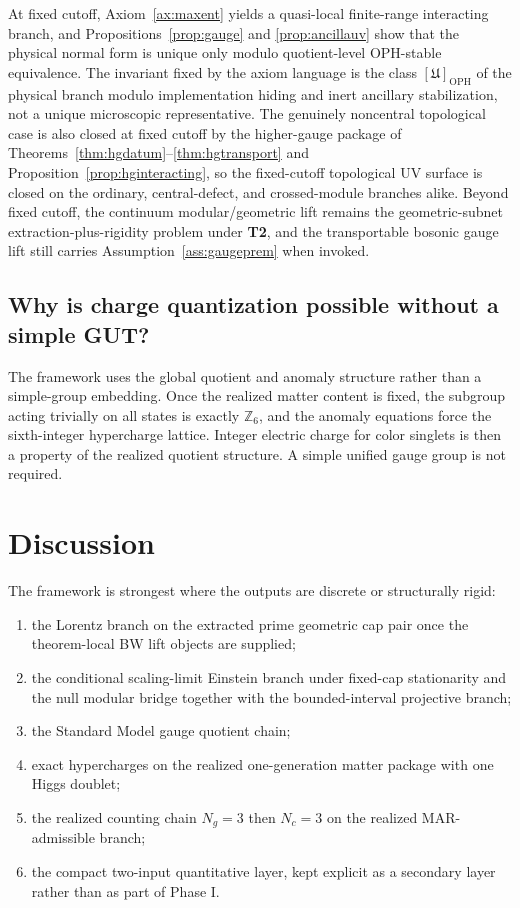 \documentclass[11pt]{article}
\begin{document}
At fixed cutoff, Axiom~\ref{ax:maxent} yields a quasi-local finite-range interacting branch, and Propositions~\ref{prop:gauge} and \ref{prop:ancillauv} show that the physical normal form is unique only modulo quotient-level OPH-stable equivalence. The invariant fixed by the axiom language is the class \([\mathfrak U]_{\mathrm{OPH}}\) of the physical branch modulo implementation hiding and inert ancillary stabilization, not a unique microscopic representative. The genuinely noncentral topological case is also closed at fixed cutoff by the higher-gauge package of Theorems~\ref{thm:hgdatum}--\ref{thm:hgtransport} and Proposition~\ref{prop:hginteracting}, so the fixed-cutoff topological UV surface is closed on the ordinary, central-defect, and crossed-module branches alike. Beyond fixed cutoff, the continuum modular/geometric lift remains the geometric-subnet extraction-plus-rigidity problem under \textbf{T2}, and the transportable bosonic gauge lift still carries Assumption~\ref{ass:gaugeprem} when invoked.

\subsection{Why is charge quantization possible without a simple GUT?}

The framework uses the global quotient and anomaly structure rather than a simple-group embedding. Once the realized matter content is fixed, the subgroup acting trivially on all states is exactly $\mathbb Z_6$, and the anomaly equations force the sixth-integer hypercharge lattice. Integer electric charge for color singlets is then a property of the realized quotient structure. A simple unified gauge group is not required.

\section{Discussion}

The framework is strongest where the outputs are discrete or structurally rigid:
\begin{enumerate}[leftmargin=2em]
\item the Lorentz branch on the extracted prime geometric cap pair once the theorem-local BW lift objects are supplied;
\item the conditional scaling-limit Einstein branch under fixed-cap stationarity and the null modular bridge together with the bounded-interval projective branch;
\item the Standard Model gauge quotient chain;
\item exact hypercharges on the realized one-generation matter package with one Higgs doublet;
\item the realized counting chain \(N_g=3\) then \(N_c=3\) on the realized MAR-admissible branch;
\item the compact two-input quantitative layer, kept explicit as a secondary layer rather than as part of Phase I.
\end{enumerate}
\end{document}
